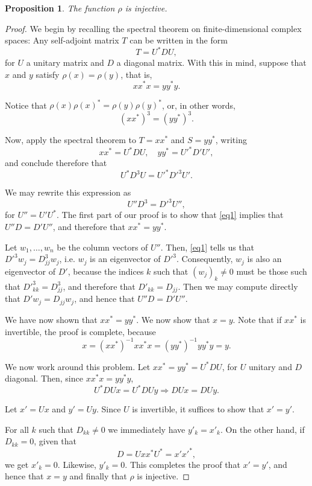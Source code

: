 \documentclass{article}
\theoremstyle{plain}
\newtheorem{prop}{Proposition}
\theoremstyle{nonumberplain}
\newtheorem{proof}{Proof}
\begin{document}
\begin{prop}
The function $\rho$ is injective.
\end{prop}

\begin{proof}
We begin by recalling the spectral theorem on finite-dimensional complex spaces: Any self-adjoint matrix $T$ can be written in the form
\[T = U^* D U,\]
for $U$ a unitary matrix and $D$ a diagonal matrix. With this in mind, suppose that $x$ and $y$ satisfy $\rho(x) = \rho(y)$, that is,
\[x x^* x = y y^* y.\]

Notice that $\rho(x) \rho(x)^* = \rho(y) \rho(y)^*$, or, in other words,
\[(x x^*)^3 = (y y^*)^3.\]

Now, apply the spectral theorem to $T = x x^*$ and $S = y y^*$, writing
\[x x^* = U^* D U, \quad y y^* = U'^* D' U',\]
and conclude therefore that
\[U^* D^3 U = U'^* D'^3 U'.\]

We may rewrite this expression as
\begin{equation}
U'' D^3 = D'^3 U'',\label{eq1}
\end{equation}
for $U'' = U' U^*$. The first part of our proof is to show that \eqref{eq1} implies that $U'' D = D' U''$, and therefore that $x x^* = y y^*$.

Let $w_1, \dots, w_n$ be the column vectors of $U''$. Then, \eqref{eq1} tells us that $D'^3 w_j = D_{jj}^3 w_j$, i.e. $w_j$ is an eigenvector of $D'^3$. Consequently, $w_j$ is also an eigenvector of $D'$, because the indices $k$ such that $(w_j)_k \neq 0$ must be those such that $D'^3_{kk} = D_{jj}^3$, and therefore that $D'_{kk} = D_{jj}$. Then we may compute directly that $D' w_j = D_{jj} w_j$, and hence that $U'' D = D' U''$.

We have now shown that $x x^* = y y^*$. We now show that $x = y$. Note that if $x x^*$ is invertible, the proof is complete, because
\begin{equation}
x = (x x^*)^{-1} x x^* x = (y y^*)^{-1} y y^* y = y. 
\end{equation}

We now work around this problem. Let $x x^* = y y^* = U^* D U$, for $U$ unitary and $D$ diagonal. Then, since $x x^* x = y y^* y$,
\begin{equation}
U^* D U x = U^* D U y \Rightarrow D U x = D U y.
\end{equation}

Let $x' = U x$ and $y' = U y$. Since $U$ is invertible, it suffices to show that $x' = y'$.

For all $k$ such that $D_{kk} \neq 0$ we immediately have $y'_k = x'_k$. On the other hand, if $D_{kk} = 0$, given that
\begin{equation}
D = U x x^* U^* = x' x'^*,
\end{equation}
we get $x'_k = 0$. Likewise, $y'_k = 0$. This completes the proof that $x' = y'$, and hence that $x = y$ and finally that $\rho$ is injective.
\end{proof}
\end{document}
